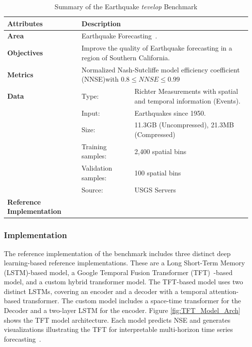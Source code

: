 \documentclass[utf8]{FrontiersinVancouver} %
\begin{document}
\begin{table}
\caption{Summary of the Earthquake {\em tevelop} Benchmark}\label{tab:eq-summary}
\begin{center}
  {\footnotesize
\begin{tabular}{|p{}p{}p{}|}
\hline
{\bf Attributes} & {\bf Description} \\
\hline
\hline
{\bf Area} & \multicolumn{2}{l|}{Earthquake Forecasting~\citep{fox2022-jm,TFT-21,eq-code,eq-data}.}\\
\hline
{\bf Objectives} &  \multicolumn{2}{l|}{Improve the quality of Earthquake
forecasting in a region of Southern California.}\\
\hline
{\bf Metrics} & \multicolumn{2}{l|}{Normalized Nash-Sutcliffe model efficiency coefficient (NNSE)with $0.8\leq NNSE\leq 0.99$}\\
\hline
{\bf Data}  & Type:  & Richter Measurements with spatial and temporal information (Events). \\
  &  Input:  & Earthquakes since 1950.\\
  &  Size:  & 11.3GB (Uncompressed), 21.3MB (Compressed)\\
  & Training samples: & 2,400 spatial bins\\
  & Validation samples:  &  100 spatial bins\\
  & Source:  & USGS Servers~\citep{eq-data}\\
\hline
{\bf Reference Implementation} & \citep{eq-code} & \\
\hline
\end{tabular}
}
\end{center}
\end{table}


\subsubsection{Implementation}

The reference implementation of the benchmark includes three distinct
deep learning-based reference implementations. These are a Long
Short-Term Memory (LSTM)-based model, a Google Temporal Fusion
Transformer (TFT)~\citep{TFT-21}-based model, and a custom hybrid
transformer model. The TFT-based model uses two distinct LSTMs,
covering an encoder and a decoder with a temporal attention-based
transformer. The custom model includes a space-time transformer for
the Decoder and a two-layer LSTM for the encoder. Figure \ref{fig:TFT_Model_Arch} 
shows the TFT model architecture. Each model predicts
NSE and generates visualizations illustrating the TFT for
interpretable multi-horizon time series
forecasting~\citep{TFT-21}. 
\end{document}
